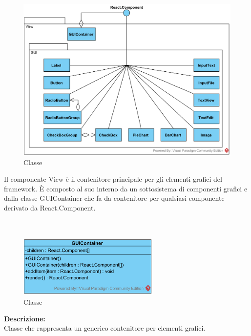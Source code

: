 \subsubsection[::View]{\class}\label{\class}
\begin{figure}[H]
	\centering
	\includegraphics[width=15cm]{./diagrammi/framework/view.png}
	\caption{Classe \class}
\end{figure}
Il componente View è il contenitore principale per gli elementi grafici del framework. È composto al suo interno da un sottosistema di componenti grafici e dalla classe GUIContainer che fa da contenitore per qualsiasi componente derivato da React.Component.

\paragraph[::GUIContainer]{\class}\mbox{}\\ \label{\class}
\begin{figure}[H]
	\centering
	\includegraphics[width=7cm]{./diagrammi/framework/view/guicontainer.png}
	\caption{Classe \class}
\end{figure}
\textbf{Descrizione:}\\
Classe che rappresenta un generico contenitore per elementi grafici.

